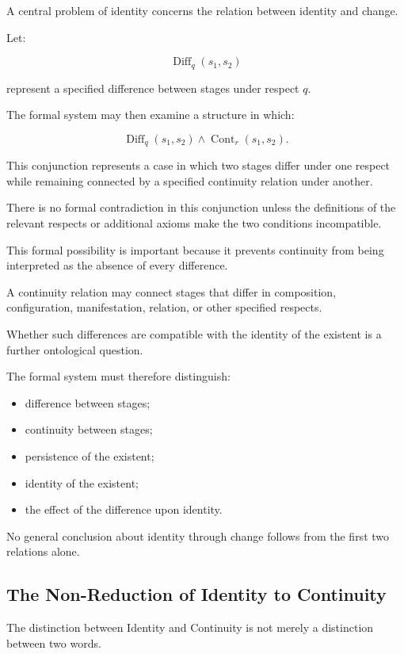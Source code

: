 A central problem of identity
concerns the relation between
identity and change.

Let:

\[
    \operatorname{Diff}_{q}(s_1,s_2)
\]

represent a specified difference
between stages under respect \(q\).

The formal system may then
examine a structure in which:

\[
    \operatorname{Diff}_{q}(s_1,s_2)
    \land
    \operatorname{Cont}_{r}(s_1,s_2).
\]

This conjunction represents
a case in which two stages
differ under one respect
while remaining connected
by a specified continuity
relation under another.

There is no formal contradiction
in this conjunction unless
the definitions of the relevant
respects or additional axioms
make the two conditions
incompatible.

This formal possibility
is important because it
prevents continuity from
being interpreted as the
absence of every difference.

A continuity relation may
connect stages that differ
in composition, configuration,
manifestation, relation, or
other specified respects.

Whether such differences
are compatible with the
identity of the existent
is a further ontological
question.

The formal system must
therefore distinguish:

\begin{itemize}
    \item difference between
    stages;
    \item continuity between
    stages;
    \item persistence of the
    existent;
    \item identity of the
    existent;
    \item the effect of the
    difference upon identity.
\end{itemize}

No general conclusion
about identity through
change follows from the
first two relations alone.

\subsection{The Non-Reduction of Identity to Continuity}

The distinction between
Identity and Continuity
is not merely a distinction
between two words.

